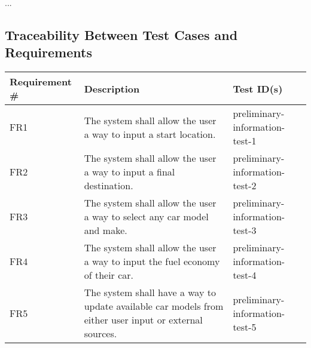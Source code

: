 \documentclass[12pt, titlepage]{article}
\begin{document}
...

\newpage

\subsection{Traceability Between Test Cases and Requirements}
  
  \begin{table}[!hbp]
	
	\begin{tabular}{|p{3.5cm}|p{6.5cm}|p{4.5cm}|}

	\hline
	\textbf{Requirement \#} & \textbf{Description}                                                                                                                                                                  & \textbf{Test ID(s)}                                                                                          \\ \hline
	FR1                     & The system shall allow the user a way to input a start location.                                                                                     & preliminary-information-test-1                                                                                                 \\ \hline
	FR2                     & The system shall allow the user a way to input a final destination.                                                                             & preliminary-information-test-2                                                                                               \\ \hline
	FR3                     & The system shall allow the user a way to select any car model and make.                                                                                                  & preliminary-information-test-3                                                                                         \\ \hline
	FR4                     & The system shall allow the user a way to input the fuel economy of their car.  & preliminary-information-test-4                                                                                         \\ \hline
	FR5                     & The system shall have a way to update available car models from either user input or external sources.                                                                                                         & preliminary-information-test-5                                                                                          \\ \hline

\end{tabular}
\end{table}
\end{document}
